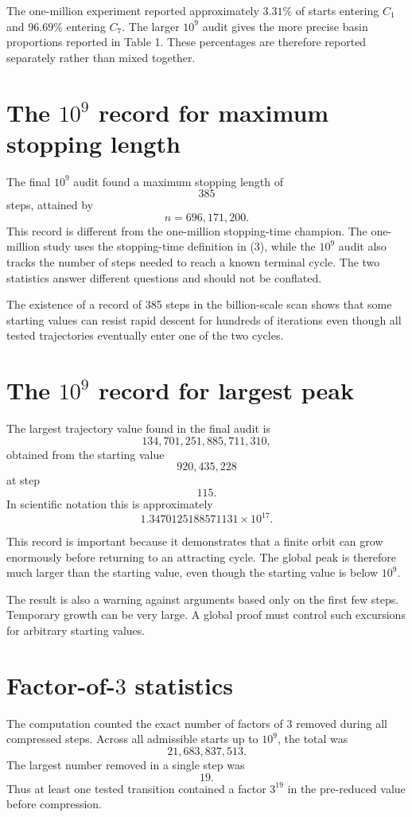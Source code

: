 \documentclass[11pt]{article}
\begin{document}
The one-million experiment reported approximately $3.31\%$ of starts entering $C_1$ and $96.69\%$ entering $C_7$. The larger $10^9$ audit gives the more precise basin proportions reported in Table 1. These percentages are therefore reported separately rather than mixed together.

\section{The $10^9$ record for maximum stopping length}
The final $10^9$ audit found a maximum stopping length of
\[
385
\]
steps, attained by
\[
n=696,171,200.
\]
This record is different from the one-million stopping-time champion. The one-million study uses the stopping-time definition in (3), while the $10^9$ audit also tracks the number of steps needed to reach a known terminal cycle. The two statistics answer different questions and should not be conflated.

The existence of a record of 385 steps in the billion-scale scan shows that some starting values can resist rapid descent for hundreds of iterations even though all tested trajectories eventually enter one of the two cycles.

\section{The $10^9$ record for largest peak}
The largest trajectory value found in the final audit is
\[
134,701,251,885,711,310,
\]
obtained from the starting value
\[
920,435,228
\]
at step
\[
115.
\]
In scientific notation this is approximately
\[
1.3470125188571131\times10^{17}.
\]

This record is important because it demonstrates that a finite orbit can grow enormously before returning to an attracting cycle. The global peak is therefore much larger than the starting value, even though the starting value is below $10^9$.

The result is also a warning against arguments based only on the first few steps. Temporary growth can be very large. A global proof must control such excursions for arbitrary starting values.

\section{Factor-of-$3$ statistics}
The computation counted the exact number of factors of $3$ removed during all compressed steps. Across all admissible starts up to $10^9$, the total was
\[
21,683,837,513.
\]
The largest number removed in a single step was
\[
19.
\]
Thus at least one tested transition contained a factor $3^{19}$ in the pre-reduced value before compression.
\end{document}
